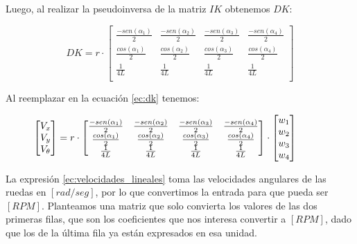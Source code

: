 Luego, al realizar la pseudoinversa de la matriz $IK$ obtenemos $DK$:

\begin{equation}
	DK = r \cdot
	\begin{bmatrix}
    	{\frac{-sen(\alpha_1)}{2}} & {\frac{-sen(\alpha_2)}{2}} & {\frac{-sen(\alpha_3)}{2}} & {\frac{-sen(\alpha_4)}{2}} \\
    	{\frac{cos(\alpha_1)}{2}}  & {\frac{cos(\alpha_2)}{2}}  & {\frac{cos(\alpha_3)}{2}}  & {\frac{cos(\alpha_4)}{2}}  \\
    	{\frac{1}{4L}}  & {\frac{1}{4L}}  & {\frac{1}{4L}}  & {\frac{1}{4L}}  \\
	\end{bmatrix}
	\label{ec:dk}
\end{equation}

Al reemplazar en la ecuación \ref{ec:dk} tenemos:

\small{
\begin{equation}
	\hspace{-1.1cm}
	\begin{bmatrix}
    	V_x \\ V_y \\ V_\theta \\
	\end{bmatrix} = r \cdot
	\begin{bmatrix}
    	{\frac{-sen(\alpha_1)}{2}} & {\frac{-sen(\alpha_2)}{2}} & {\frac{-sen(\alpha_3)}{2}} & {\frac{-sen(\alpha_4)}{2}} \\
    	{\frac{cos(\alpha_1)}{2}}  & {\frac{cos(\alpha_2)}{2}}  & {\frac{cos(\alpha_3)}{2}}  & {\frac{cos(\alpha_4)}{2}}  \\
    	{\frac{1}{4L}}  & {\frac{1}{4L}}  & {\frac{1}{4L}}  & {\frac{1}{4L}}  \\
	\end{bmatrix} \cdot
	\begin{bmatrix}
    	w_1 \\ w_2 \\ w_3 \\ w_4 \\
	\end{bmatrix}
	\label{ec:velocidades_lineales}
\end{equation}
} \normalsize

La expresión \ref{ec:velocidades_lineales} toma las velocidades angulares de las ruedas en $[rad/seg]$, por lo que convertimos la entrada para que pueda ser $[RPM]$. Planteamos una matriz que solo convierta los valores de las dos primeras filas, que son los coeficientes que nos interesa convertir a $[RPM]$, dado que los de la última fila ya están expresados en esa unidad.

